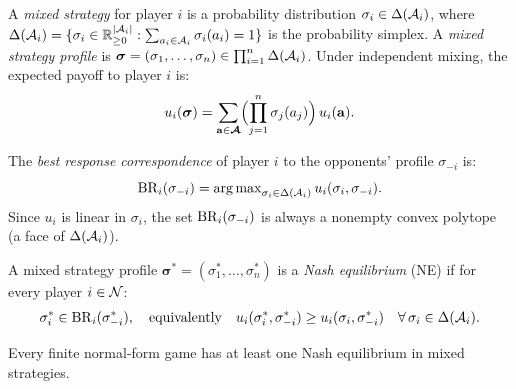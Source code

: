 \documentclass[11pt,a4paper]{article}
\begin{document}
\begin{definition}
\label{def:mixed-strategy}
A \emph{mixed strategy} for player $i$ is a probability distribution
$\sigma_i \in \Delta(\mathcal{A}_i)$, where
$\Delta(\mathcal{A}_i) = \{\sigma_i \in \mathbb{R}^{|\mathcal{A}_i|}_{\geq 0}
: \sum_{a_i \in \mathcal{A}_i} \sigma_i(a_i) = 1\}$ is the probability
simplex.  A \emph{mixed strategy profile} is $\boldsymbol{\sigma} =
(\sigma_1, \ldots, \sigma_n) \in \prod_{i=1}^n \Delta(\mathcal{A}_i)$.
Under independent mixing, the expected payoff to player $i$ is:
\begin{equation}
\label{eq:expected-payoff}
  u_i(\boldsymbol{\sigma})
  = \sum_{\mathbf{a} \in \boldsymbol{\mathcal{A}}}
    \Bigl(\prod_{j=1}^n \sigma_j(a_j)\Bigr) \, u_i(\mathbf{a}).
\end{equation}
\end{definition}

\begin{definition}
\label{def:best-response}
The \emph{best response correspondence} of player $i$ to the
opponents' profile $\sigma_{-i}$ is:
\begin{equation}
\label{eq:best-response}
  \mathrm{BR}_i(\sigma_{-i})
  = \operatorname{arg\,max}_{\sigma_i \in \Delta(\mathcal{A}_i)}
    u_i(\sigma_i, \sigma_{-i}).
\end{equation}
Since $u_i$ is linear in $\sigma_i$, the set $\mathrm{BR}_i(\sigma_{-i})$ is
always a nonempty convex polytope (a face of $\Delta(\mathcal{A}_i)$).
\end{definition}

\begin{definition}
\label{def:nash}
A mixed strategy profile $\boldsymbol{\sigma}^* = (\sigma_1^*,
\ldots, \sigma_n^*)$ is a \emph{Nash equilibrium} (NE) if for every
player $i \in \mathcal{N}$:
\begin{equation}
\label{eq:nash-condition}
  \sigma_i^* \in \mathrm{BR}_i(\sigma_{-i}^*),
  \quad \text{equivalently} \quad
  u_i(\sigma_i^*, \sigma_{-i}^*) \geq
  u_i(\sigma_i, \sigma_{-i}^*)
  \quad \forall\, \sigma_i \in \Delta(\mathcal{A}_i).
\end{equation}
\end{definition}

\begin{theorem}
\label{thm:nash-existence}
Every finite normal-form game has at least one Nash equilibrium in
mixed strategies.
\end{theorem}
\end{document}
